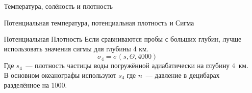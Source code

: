 \begin{chapter}{Температура, солёность и плотность}
\begin{section}{Потенциальная температура, потенциальная плотность и Сигма}
\begin{paragraph}{Потенциальная Плотность}
Если сравниваются пробы с больших глубин, лучше использовать значения
сигмы для глубины 4 км.
\begin{equation}
\sigma_4 = \sigma(s, \Theta, 4000)
\end{equation}
Где $s_4$~--- плотность частицы воды погружённой адиабатически на
глубину 4~км. В основном океанографы используют $s_4$ где $n$~--- давление
в децибарах разделённое на 1000.
%
%

\end{paragraph}


\end{section}
\end{chapter}
